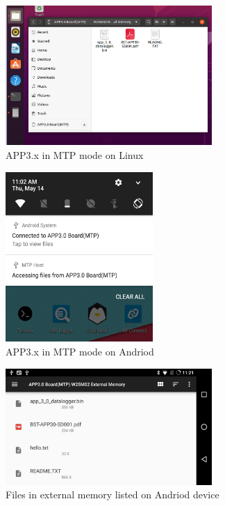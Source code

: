 \documentclass{article}
\begin{document}
\begin{figure}[H]
	\begin{center}
		\includegraphics[width=0.7\textwidth]{coinesAPI_images/MTP_Ubuntu_Nautilus.png}
		\caption{APP3.x in MTP mode on Linux}
	\end{center}
\end{figure}

\begin{figure}[H]
	\begin{center}
		\includegraphics[width=0.5\textwidth]{coinesAPI_images/MTP_Android_2.png}
		\caption{APP3.x in MTP mode on Andriod}
	\end{center}
\end{figure}

\begin{figure}[H]
	\begin{center}
		\includegraphics[width=0.7\textwidth]{coinesAPI_images/MTP_Android_3.png}
		\caption{Files in external memory listed on Andriod device}
	\end{center}
\end{figure}
\end{document}
